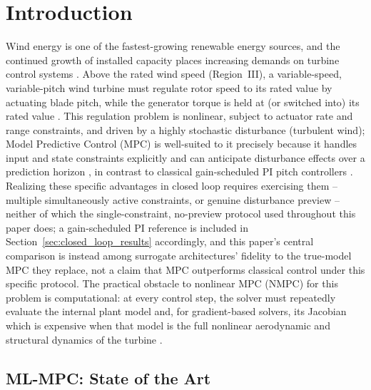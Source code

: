 
\section{Introduction}
\label{sec:introduction}

Wind energy is one of the fastest-growing renewable energy sources, and
the continued growth of installed capacity places increasing demands on
turbine control systems \citep{pao2009}. Above the rated wind speed
(Region~III), a variable-speed, variable-pitch wind turbine must regulate
rotor speed to its rated value by actuating blade pitch, while the
generator torque is held at (or switched into) its rated value
\citep{bianchi2006}. This regulation problem is nonlinear, subject to
actuator rate and range constraints, and driven by a highly stochastic
disturbance (turbulent wind); Model Predictive Control (MPC) is
well-suited to it precisely because it handles input and state
constraints explicitly and can anticipate disturbance effects over a
prediction horizon \citep{rawlings2017}, in contrast to classical
gain-scheduled PI pitch
controllers \citep{bianchi2006,pao2009,laks2009}. Realizing these
specific advantages in closed loop requires exercising them --
multiple simultaneously active constraints, or genuine disturbance
preview -- neither of which the single-constraint, no-preview
protocol used throughout this paper does; a gain-scheduled PI
reference is included in Section~\ref{sec:closed_loop_results}
accordingly, and this paper's central comparison is instead among
surrogate architectures' fidelity to the true-model MPC they replace,
not a claim that MPC outperforms classical control under this
specific protocol. The practical obstacle to
nonlinear MPC (NMPC) for this problem is computational: at every control
step, the solver must repeatedly evaluate the internal plant model and,
for gradient-based solvers, its Jacobian which is expensive when that
model is the full nonlinear aerodynamic and structural dynamics of the
turbine \citep{schlipf2013,evans2022}.

\subsection{ML-MPC: State of the Art}
\label{subsec:soa}

